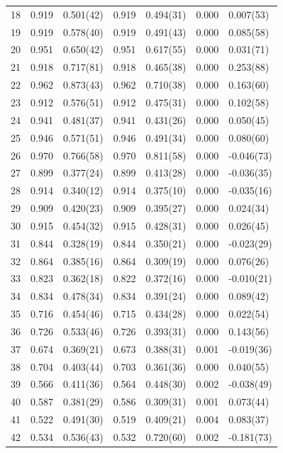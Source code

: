 \documentclass[aps, prc, tightenlines,superscriptaddress, letterpaper, amsmath, amssymb, preprintnumbers, floatfix, longbibliography, nofootinbib]{revtex4-2}
\begin{document}
\begin{table}[!htb]
{\begin{tabularx}{\textwidth}{| c || Y | Y | Y | Y | Y | Y |}
18	&	0.919	&	0.501(42)	&	0.919	&	0.494(31)	&	0.000	&	0.007(53)	\\
19	&	0.919	&	0.578(40)	&	0.919	&	0.491(43)	&	0.000	&	0.085(58)	\\
20	&	0.951	&	0.650(42)	&	0.951	&	0.617(55)	&	0.000	&	0.031(71)	\\
21	&	0.918	&	0.717(81)	&	0.918	&	0.465(38)	&	0.000	&	0.253(88)	\\
22	&	0.962	&	0.873(43)	&	0.962	&	0.710(38)	&	0.000	&	0.163(60)	\\
23	&	0.912	&	0.576(51)	&	0.912	&	0.475(31)	&	0.000	&	0.102(58)	\\
24	&	0.941	&	0.481(37)	&	0.941	&	0.431(26)	&	0.000	&	0.050(45)	\\
25	&	0.946	&	0.571(51)	&	0.946	&	0.491(34)	&	0.000	&	0.080(60)	\\
26	&	0.970	&	0.766(58)	&	0.970	&	0.811(58)	&	0.000	&	-0.046(73)	\\
27	&	0.899	&	0.377(24)	&	0.899	&	0.413(28)	&	0.000	&	-0.036(35)	\\
28	&	0.914	&	0.340(12)	&	0.914	&	0.375(10)	&	0.000	&	-0.035(16)	\\
29	&	0.909	&	0.420(23)	&	0.909	&	0.395(27)	&	0.000	&	0.024(34)	\\
30	&	0.915	&	0.454(32)	&	0.915	&	0.428(31)	&	0.000	&	0.026(45)	\\
31	&	0.844	&	0.328(19)	&	0.844	&	0.350(21)	&	0.000	&	-0.023(29)	\\
32	&	0.864	&	0.385(16)	&	0.864	&	0.309(19)	&	0.000	&	0.076(26)	\\
33	&	0.823	&	0.362(18)	&	0.822	&	0.372(16)	&	0.000	&	-0.010(21)	\\
34	&	0.834	&	0.478(34)	&	0.834	&	0.391(24)	&	0.000	&	0.089(42)	\\
35	&	0.716	&	0.454(46)	&	0.715	&	0.434(28)	&	0.000	&	0.022(54)	\\
36	&	0.726	&	0.533(46)	&	0.726	&	0.393(31)	&	0.000	&	0.143(56)	\\
37	&	0.674	&	0.369(21)	&	0.673	&	0.388(31)	&	0.001	&	-0.019(36)	\\
38	&	0.704	&	0.403(44)	&	0.703	&	0.361(36)	&	0.000	&	0.040(55)	\\
39	&	0.566	&	0.411(36)	&	0.564	&	0.448(30)	&	0.002	&	-0.038(49)	\\
40	&	0.587	&	0.381(29)	&	0.586	&	0.309(31)	&	0.001	&	0.073(44)	\\
41	&	0.522	&	0.491(30)	&	0.519	&	0.409(21)	&	0.004	&	0.083(37)	\\
42	&	0.534	&	0.536(43)	&	0.532	&	0.720(60)	&	0.002	&	-0.181(73)	\\

\end{tabularx}}
\end{table}
\end{document}
